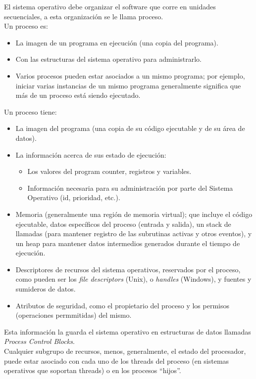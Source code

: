 \documentclass[a4paper, twoside]{article}
\begin{document}
El sistema operativo debe organizar el software que corre en unidades
secuenciales, a esta organización se le llama proceso.\\

Un proceso es:
\begin{itemize}
  \item La imagen de un programa en ejecución (una copia del programa).
  \item Con las estructuras del sistema operativo para administrarlo.
  \item Varios procesos pueden estar asociados a un mismo programa;
  por ejemplo, iniciar varias instancias de un mismo programa generalmente
  significa que más de un proceso está siendo ejecutado.
\end{itemize}

Un proceso tiene:
\begin{itemize}
  \item La imagen del programa (una copia de su código ejecutable y de su área
  de datos).
  \item La información acerca de sus estado de ejecución:
  \begin{itemize}
    \item Los valores del program counter, registros y variables.
    \item Información necesaria para su administración por parte del Sistema
    Operativo (id, prioridad, etc.).
  \end{itemize}
  \item Memoria (generalmente una región de memoria virtual);
  que incluye el código ejecutable, datos específicos del proceso (entrada y
  salida), un stack de llamadas (para mantener registro de las subrutinas
  activas y otros eventos), y un heap para mantener datos intermedios generados
  durante el tiempo de ejecución.
  \item Descriptores de recursos del sistema operativos, reservados por el
  proceso, como pueden ser los \emph{file descriptors} (Unix), o \emph{handles}
  (Windows), y fuentes y sumideros de datos.
  \item Atributos de seguridad, como el propietario del proceso y los permisos
  (operaciones permmitidas) del mismo.
\end{itemize}

Esta información la guarda el sistema operativo en estructuras de datos
llamadas \emph{Process Control Blocks}.\\

Cualquier subgrupo de recursos, menos, generalmente, el estado del procesador,
puede estar asociado con cada uno de los threads del proceso (en sistemas
operativos que soportan threads) o en los procesos ``hijos''.
\end{document}

